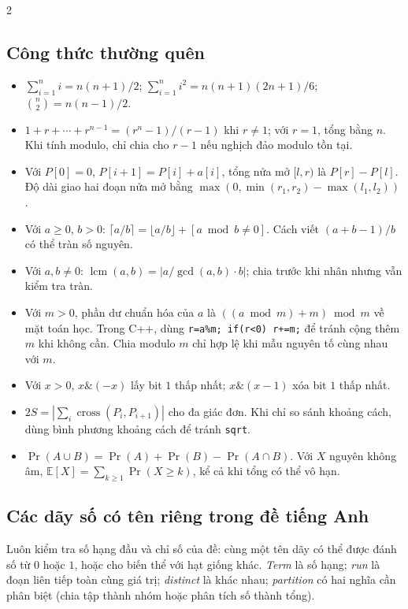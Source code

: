 \begin{multicols}{2}
\subsection{Công thức thường quên}
\begin{itemize}
\setlength{\itemsep}{2pt}
\item $\sum_{i=1}^{n}i=n(n+1)/2$;
      $\sum_{i=1}^{n}i^2=n(n+1)(2n+1)/6$;
      $\binom n2=n(n-1)/2$.
\item $1+r+\cdots+r^{n-1}=(r^n-1)/(r-1)$ khi $r\ne1$;
      với $r=1$, tổng bằng $n$. Khi tính modulo, chỉ chia cho $r-1$
      nếu nghịch đảo modulo tồn tại.
\item Với $P[0]=0$, $P[i+1]=P[i]+a[i]$, tổng nửa mở $[l,r)$
      là $P[r]-P[l]$. Độ dài giao hai đoạn nửa mở bằng
      $\max(0,\min(r_1,r_2)-\max(l_1,l_2))$.
\item Với $a\ge0$, $b>0$:
      $\lceil a/b\rceil=\lfloor a/b\rfloor+[a\bmod b\ne0]$.
      Cách viết $(a+b-1)/b$ có thể tràn số nguyên.
\item Với $a,b\ne0$:
      $\operatorname{lcm}(a,b)=|a/\gcd(a,b)\cdot b|$;
      chia trước khi nhân nhưng vẫn kiểm tra tràn.
\item Với $m>0$, phần dư chuẩn hóa của $a$ là
      $((a\bmod m)+m)\bmod m$ về mặt toán học.
      Trong C++, dùng \texttt{r=a\%m; if(r<0) r+=m;}
      để tránh cộng thêm $m$ khi không cần.
      Chia modulo $m$ chỉ hợp lệ khi mẫu nguyên tố cùng nhau với $m$.
\item Với $x>0$, $x\mathbin{\&}(-x)$ lấy bit $1$ thấp nhất;
      $x\mathbin{\&}(x-1)$ xóa bit $1$ thấp nhất.
\item $2S=|\sum_i\operatorname{cross}(P_i,P_{i+1})|$
      cho đa giác đơn. Khi chỉ so sánh khoảng cách, dùng bình phương
      khoảng cách để tránh \texttt{sqrt}.
\item $\Pr(A\cup B)=\Pr(A)+\Pr(B)-\Pr(A\cap B)$.
      Với $X$ nguyên không âm,
      $\mathbb E[X]=\sum_{k\ge1}\Pr(X\ge k)$,
      kể cả khi tổng có thể vô hạn.
\end{itemize}

\subsection{Các dãy số có tên riêng trong đề tiếng Anh}
Luôn kiểm tra số hạng đầu và chỉ số của đề: cùng một tên dãy
có thể được đánh số từ $0$ hoặc $1$, hoặc cho biến thể với hạt giống khác.
\emph{Term} là số hạng; \emph{run} là đoạn liên tiếp toàn cùng giá trị;
\emph{distinct} là khác nhau; \emph{partition} có hai nghĩa cần phân biệt
(chia tập thành nhóm hoặc phân tích số thành tổng).


\end{multicols}
